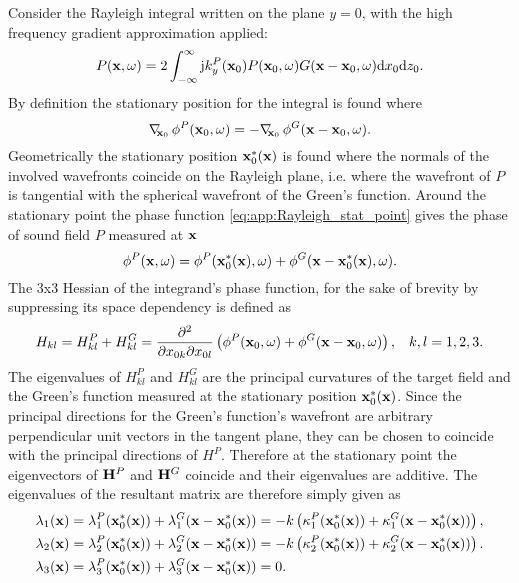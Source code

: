 Consider the Rayleigh integral written on the plane $y = 0$, with the high frequency gradient approximation applied:
\begin{equation}
P(\mathbf{x},\omega) = 2 \int_{-\infty}^{\infty} \mathrm{j} k_y^P(\mathbf{x}_0) P(\mathbf{x}_0, \omega) G(\mathbf{x}-\mathbf{x}_0,\omega) \mathrm{d} x_0  \mathrm{d} z_0.
\end{equation}
By definition the stationary position for the integral is found where
\begin{equation}
\label{eq:app:Rayleigh_stat_point}
\Dxo \phi^P(\vxo,\omega) = -\Dxo \phi^G(\vx-\vxo,\omega).  %
\end{equation}
Geometrically the stationary position $\mathbf{x}_0^*(\mathbf{x})$ is found where the normals of the involved wavefronts coincide on the Rayleigh plane, i.e. where the wavefront of $P$ is tangential with the spherical wavefront of the Green's function.
Around the stationary point the phase function \eqref{eq:app:Rayleigh_stat_point} gives the phase of sound field $P$ measured at $\mathbf{x}$
\begin{equation}
\phi^P(\vx,\omega) = \phi^P(\vxo^*(\vx),\omega) + \phi^G(\vx-\vxo^*(\vx),\omega).  %
\end{equation}
The 3x3 Hessian of the integrand's phase function, for the sake of brevity by suppressing its space dependency is defined as
\begin{equation}
\label{eq:app:Hessian_for_Rayleigh}
H_{kl} = H_{kl}^P+ H_{kl}^G = \frac{\partial^2}{\partial x_{0 k} \partial x_{0 l}}\left( \phi^P(\mathbf{x}_0,\omega) + \phi^G(\mathbf{x}-\mathbf{x}_0,\omega) \right), \hspace{3mm} k,l = 1,2,3.
\end{equation}
The eigenvalues of $H_{kl}^P$ and $H_{kl}^G$ are the principal curvatures of the target field and the Green's function measured at the stationary position $\mathbf{x}_0^*(\mathbf{x})$.
Since the principal directions for the Green's function's wavefront are arbitrary perpendicular unit vectors in the tangent plane, they can be chosen to coincide with the principal directions of $H^P$.
Therefore at the stationary point the eigenvectors of $\mathbf{H}^P$ and $\mathbf{H}^G$ coincide and their eigenvalues are additive.
The eigenvalues of the resultant matrix are therefore simply given as
\begin{align}
\label{eq:app:propagated_curvature}
\lambda_1(\mathbf{x}) &= \lambda_1^P(\mathbf{x}_0^*(\mathbf{x})) + \lambda_1^G(\mathbf{x}-\mathbf{x}_0^*(\mathbf{x})) = -k \left( \kappa_1^P(\mathbf{x}_0^*(\mathbf{x})) + \kappa_1^G(\mathbf{x}-\mathbf{x}_0^*(\mathbf{x})) \right), \\
\lambda_2(\mathbf{x}) &= \lambda_2^P(\mathbf{x}_0^*(\mathbf{x})) + \lambda_2^G(\mathbf{x}-\mathbf{x}_0^*(\mathbf{x})) = -k \left( \kappa_2^P(\mathbf{x}_0^*(\mathbf{x})) + \kappa_2^G(\mathbf{x}-\mathbf{x}_0^*(\mathbf{x})) \right). \\
\lambda_3(\mathbf{x}) &= \lambda_3^P(\mathbf{x}_0^*(\mathbf{x})) + \lambda_3^G(\mathbf{x}-\mathbf{x}_0^*(\mathbf{x})) = 0.
\end{align}
\vspace{0.5mm}

